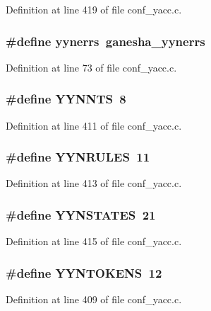 Definition at line 419 of file conf\_\-yacc.c.
\subsubsection[{yynerrs}]{\setlength{\rightskip}{0pt plus 5cm}\#define {\bf yynerrs}~ganesha\_\-yynerrs}\label{conf__yacc_8c_a956a31a9c729bfe871bb770d99e1942d}


Definition at line 73 of file conf\_\-yacc.c.
\subsubsection[{YYNNTS}]{\setlength{\rightskip}{0pt plus 5cm}\#define YYNNTS~8}\label{conf__yacc_8c_af54ae9e588f0ecc32eabbfdf1959df10}


Definition at line 411 of file conf\_\-yacc.c.
\subsubsection[{YYNRULES}]{\setlength{\rightskip}{0pt plus 5cm}\#define YYNRULES~11}\label{conf__yacc_8c_aceaba8997dc3867478ae3b816647eb7c}


Definition at line 413 of file conf\_\-yacc.c.
\subsubsection[{YYNSTATES}]{\setlength{\rightskip}{0pt plus 5cm}\#define YYNSTATES~21}\label{conf__yacc_8c_a2c387ba2caaade8bf8f78ed30023f79f}


Definition at line 415 of file conf\_\-yacc.c.
\subsubsection[{YYNTOKENS}]{\setlength{\rightskip}{0pt plus 5cm}\#define YYNTOKENS~12}\label{conf__yacc_8c_a75d260730a6c379a94ea28f63a7b9275}


Definition at line 409 of file conf\_\-yacc.c.
